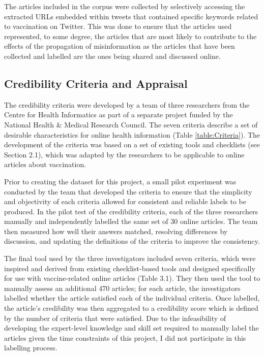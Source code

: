 \documentclass[a4paper,twoside,phd]{BYUPhys}
\begin{document}
The articles included in the corpus were collected by selectively accessing the extracted URLs embedded within tweets that contained specific keywords related to vaccination on Twitter. This was done to ensure that the articles used represented, to some degree, the articles that are most likely to contribute to the effects of the propagation of misinformation as the articles that have been collected and labelled are the ones being shared and discussed online. \newline




\subsection{Credibility Criteria and Appraisal}
\label{sec:CredibilityCriteria}
The credibility criteria were developed by a team of three researchers from the Centre for Health Informatics as part of a separate project funded by the National Health \& Medical Research Council. The seven criteria describe a set of desirable characteristics for online health information (Table \ref{table:Criteria}). The development of the criteria was based on a set of existing tools and checklists (see Section 2.1), which was adapted by the researchers to be applicable to online articles about vaccination. \newline

Prior to creating the dataset for this project, a small pilot experiment was conducted by the team that developed the criteria to ensure that the simplicity and objectivity of each criteria allowed for consistent and reliable labels to be produced. In the pilot test of the credibility criteria, each of the three researchers manually and independently labelled the same set of 30 online articles. The team then measured how well their answers matched, resolving differences by discussion, and updating the definitions of the criteria to improve the consistency. \newline


The final tool used by the three investigators included seven criteria, which were inspired and derived from existing checklist-based tools and designed specifically for use with vaccine-related online articles (Table 3.1). They then used the tool to manually assess an additional 470 articles; for each article, the investigators labelled whether the article satisfied each of the individual criteria. Once labelled, the article's credibility was then aggregated to a credibility score which is defined by the number of criteria that were satisfied. Due to the infeasibility of developing the expert-level knowledge and skill set required to manually label the articles given the time constraints of this project, I did not participate in this labelling process.\newline
\end{document}
